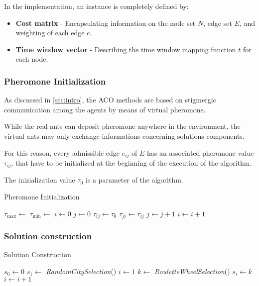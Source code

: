 \begin{homeworkProblem}
In the implementation, an instance is completely defined by:
\begin{itemize}
\item \textbf{Cost matrix} - Encapsulating information on the node set $N$, edge set $E$, and weighting of each edge $c$.
\item \textbf{Time window vector} - Describing the time window mapping function $t$ for each node.
\end{itemize}

\subsubsection{Pheromone Initialization}
As discussed in \ref{sec:intro}, the ACO methods are based on stigmergic communication among the agents by means of virtual pheromone.

While the real ants can deposit pheromone anywhere in the environment, the virtual ants may only exchange informations concerning solutions components.

For this reason, every admissible edge $e_{ij}$ of $E$ has an associated pheromone value $\tau_{ij}$, that have to be initialized at the beginning of the execution of the algorithm.

The inizialization value $\tau_0$ is a parameter of the algorithm.

\begin{algorithm}[!h]
  \caption{Pheromone Initialization}\label{init}
  \begin{algorithmic}[1]
      \State $\tau_{\max} \gets $
      \State $\tau_{\min} \gets $
      \State $i \gets 0$
      \State $j \gets 0$
          \State $\tau_{ij} \gets \tau_0$
          \State $\tau_{ji} \gets \tau_{ij}$
          \State $ j \gets j + 1$  
        \EndFor
        \State $ i \gets i + 1$ 
      \EndFor
    \EndProcedure
\end{algorithmic}
\end{algorithm}

\subsubsection{Solution construction}
\begin{algorithm}[!h]
  \caption{Solution Construction}\label{sol}
  \begin{algorithmic}[1]
      \State {}
      \State $s_0 \gets 0$ 
      \State $s_1 \gets$ \emph{RandomCitySelection}() 
      \State $i \gets 1$
        \State $k \gets $ \emph{RouletteWheelSelection}() 
        \State $s_i \gets k$ 
        \State $i \gets i+1$
      \EndWhile
    \EndProcedure
\end{algorithmic}
\end{algorithm}


\end{homeworkProblem}
